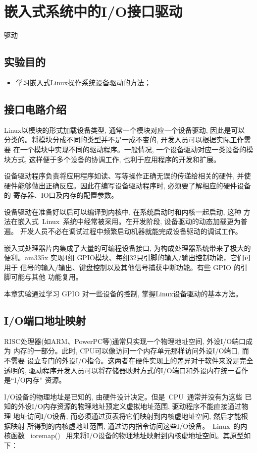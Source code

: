 \chapter{嵌入式系统中的I/O接口驱动}{驱动}

\section{实验目的}
\begin{itemize}\itemsep=-3pt
  \item 学习嵌入式Linux操作系统设备驱动的方法；
\end{itemize}

\section{接口电路介绍}
	Linux以模块的形式加载设备类型, 通常一个模块对应一个设备驱动, 因此是可以
分类的。将模块分成不同的类型并不是一成不变的, 开发人员可以根据实际工作需要
在一个模块中实现不同的驱动程序。一般情况, 一个设备驱动对应一类设备的模块方式, 
这样便于多个设备的协调工作, 也利于应用程序的开发和扩展。

	设备驱动程序负责将应用程序如读、写等操作正确无误的传递给相关的硬件, 并使
硬件能够做出正确反应。因此在编写设备驱动程序时, 必须要了解相应的硬件设备的
寄存器、IO口及内存的配置参数。

	设备驱动在准备好以后可以编译到内核中, 在系统启动时和内核一起启动, 这种
方法在嵌入式~Linux~系统中经常被采用。在开发阶段, 设备驱动的动态加载更为普遍。
开发人员不必在调试过程中频繁启动机器就能完成设备驱动的调试工作。

	嵌入式处理器片内集成了大量的可编程设备接口, 为构成处理器系统带来了极大的
便利。am335x 实现4组 GPIO模块、每组32只引脚的输入/输出控制功能，它们可用于
信号的输入/输出、键盘控制以及其他信号捕获中断功能。有些 GPIO 的引脚可能与其他
功能复用。

	本章实验通过学习 GPIO 对一些设备的控制, 掌握Linux设备驱动的基本方法。

\section{I/O端口地址映射}
	RISC处理器(如ARM、PowerPC等)通常只实现一个物理地址空间, 外设I/O端口成为
内存的一部分。此时, CPU可以像访问一个内存单元那样访问外设I/O端口, 而不需要
设立专门的外设I/O指令。这两者在硬件实现上的差异对于软件来说是完全透明的, 
驱动程序开发人员可以将存储器映射方式的I/O端口和外设内存统一看作是``I/O内存''
资源。

	I/O设备的物理地址是已知的, 由硬件设计决定。但是~CPU~通常并没有为这些
已知的外设I/O内存资源的物理地址预定义虚拟地址范围, 驱动程序不能直接通过物理
地址访问I/O设备, 而必须通过页表将它们映射到内核虚地址空间, 然后才能根据映射
所得到的内核虚地址范围, 通过访内指令访问这些I/O设备。~Linux~的内核函数
~ioremap()~ 用来将I/O设备的物理地址映射到内核虚地址空间。其原型如下：

